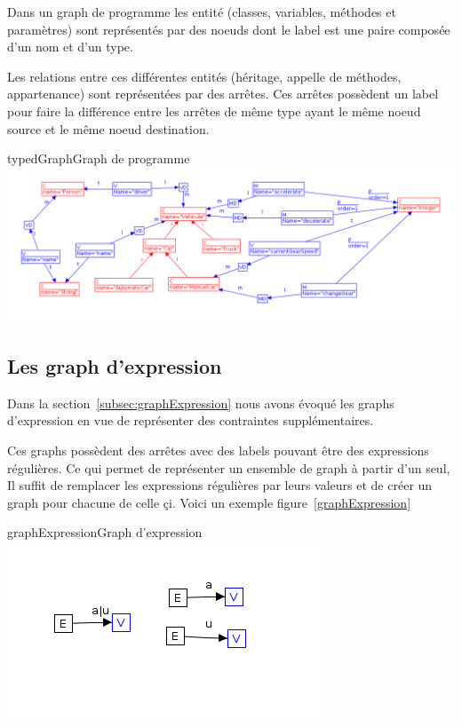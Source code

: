 \documentclass[a4paper, 12pt]{article}
\begin{document}
Dans un graph de programme les entité (classes, variables, méthodes et paramètres) sont représentés par des noeuds dont le label est une paire composée d'un nom et d'un type.

Les relations entre ces différentes entités (héritage, appelle de méthodes, appartenance) sont représentées par des arrêtes. Ces arrêtes possèdent un label pour faire la différence entre les arrêtes de même type ayant le même noeud source et le même noeud destination.

\begin{myfig}{typedGraph}{Graph de programme}
\includegraphics[width=\textwidth]{typedGraph.png}
\end{myfig}

\subsection{Les graph d'expression} 

Dans la section~\ref{subsec:graphExpression} nous avons évoqué les graphs d'expression en vue de représenter des contraintes supplémentaires. 

Ces graphs possèdent des arrêtes avec des labels pouvant être des expressions régulières. Ce qui permet de représenter un ensemble de graph à partir d'un seul, Il suffit de remplacer les expressions régulières par leurs valeurs et de créer un graph pour chacune de celle çi. Voici un exemple figure~\ref{graphExpression}

\begin{myfig}{graphExpression}{Graph d'expression}
\includegraphics{graphExpression.png}
\end{myfig}
\end{document}
